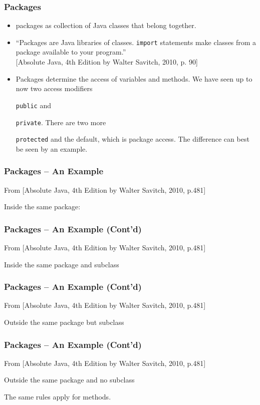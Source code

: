 \documentclass{beamer}
\def\mpause{\pause}
\def\mcolor#1#2{\rule{0ex}{0ex}\color{#1}#2\color{black}{}}
\begin{document}
\begin{frame}
\frametitle{Packages}

\begin{itemize}
\item packages as collection of Java classes that belong together.
\item
``Packages are Java libraries of classes. \texttt{import} statements
  make classes from a package available to your program.''\\{}
  [Absolute Java, 4th Edition by Walter Savitch, 2010, p. 90]
\item Packages determine the access of variables and methods.  We have
  seen up to now two access modifiers \mcolor{blue}{\texttt{public}}
  and \mcolor{blue}{\texttt{private}}. There are two more
  \mcolor{blue}{\texttt{protected}} and the default, which is package
  access. The difference can best be seen by an example.
\end{itemize}
\end{frame}

\begin{frame}
\frametitle{Packages -- An Example}

From [Absolute Java, 4th Edition by Walter Savitch, 2010, p.481]

\mcolor{blue}{Inside the same package:}

\small
\mpause
 
\end{frame}

\begin{frame}
\frametitle{Packages -- An Example (Cont'd)}

From [Absolute Java, 4th Edition by Walter Savitch, 2010, p.481]

\mcolor{blue}{Inside the same package and subclass}

\small

 
\end{frame}

\begin{frame}
\frametitle{Packages -- An Example (Cont'd)}

From [Absolute Java, 4th Edition by Walter Savitch, 2010, p.481]

\mcolor{blue}{Outside the same package but subclass}

\small

 
\end{frame}

\begin{frame}
\frametitle{Packages -- An Example (Cont'd)}

From [Absolute Java, 4th Edition by Walter Savitch, 2010, p.481]

\mcolor{blue}{Outside the same package and no subclass}

\small

 

The same rules apply for methods.
\end{frame}
\end{document}
